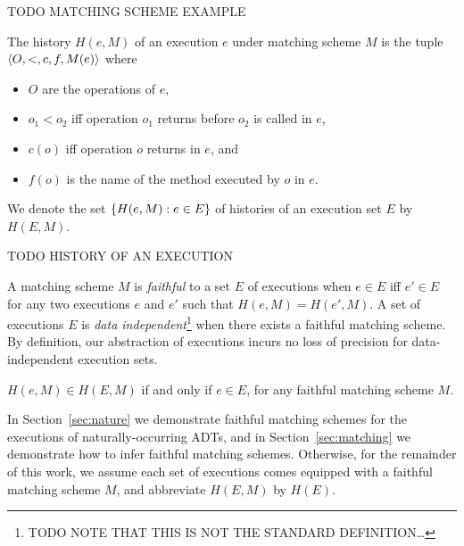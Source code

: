 \begin{example}

  TODO MATCHING SCHEME EXAMPLE

\end{example}

The history $H(e,M)$ of an execution $e$ under matching scheme $M$ is the tuple
${\left\langle{O,<,c,f,M(e)}\right\rangle}$ where
\begin{itemize}

  \item $O$ are the operations of $e$,

  \item $o_1 < o_2$ if{f} operation $o_1$ returns before $o_2$ is called in $e$,

  \item $c(o)$ if{f} operation $o$ returns in $e$, and

  \item $f(o)$ is the name of the method executed by $o$ in $e$.

\end{itemize}
We denote the set ${\{{H(e,M) : e \in E}\}}$ of histories of an execution set $E$
by $H(E,M)$.

\begin{example}

  TODO HISTORY OF AN EXECUTION

\end{example}

A matching scheme $M$ is \emph{faithful} to a set $E$ of executions when $e \in
E$ if{f} $e' \in E$ for any two executions $e$ and $e'$ such that $H(e,M) =
H(e',M)$. A set of executions $E$ is \emph{data independent}\footnote{TODO NOTE
THAT THIS IS NOT THE STANDARD DEFINITION…} when there exists a faithful
matching scheme. By definition, our abstraction of executions incurs no loss of
precision for data-independent execution sets.

\begin{lemma}

  $H(e,M) \in H(E,M)$ if and only if $e \in E$, for any faithful matching
  scheme $M$.

\end{lemma}

In Section~\ref{sec:nature} we demonstrate faithful matching schemes for the
executions of naturally-occurring ADTs, and in Section~\ref{sec:matching} we
demonstrate how to infer faithful matching schemes. Otherwise, for the
remainder of this work, we assume each set of executions comes equipped with a
faithful matching scheme $M$, and abbreviate $H(E,M)$ by $H(E)$.

